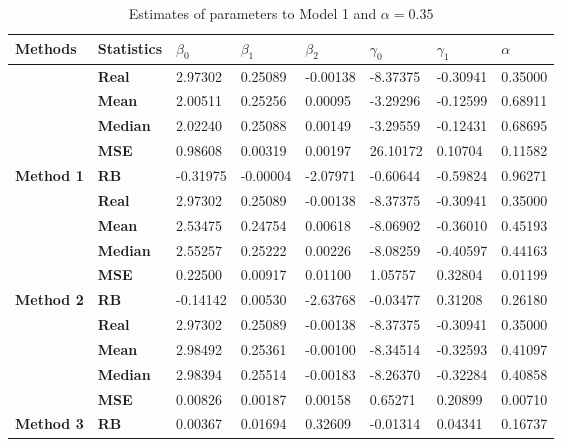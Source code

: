 \begin{table}[h]

\caption{\label{tab:Est_model_1_Alpha0.35}Estimates of parameters to Model 1 and $\alpha=0.35$}
\centering
\begin{tabular}[t]{>{}l>{}lllllll}
\toprule
Methods & Statistics & $\beta_0$ & $\beta_1$ & $\beta_2$ & $\gamma_0$ & $\gamma_1$ & $\alpha$\\
\midrule
 & \textbf{Real} & 2.97302 & 0.25089 & -0.00138 & -8.37375 & -0.30941 & 0.35000\\
\cmidrule{2-8}
 & \textbf{Mean} & 2.00511 & 0.25256 & 0.00095 & -3.29296 & -0.12599 & 0.68911\\
\cmidrule{2-8}
 & \textbf{Median} & 2.02240 & 0.25088 & 0.00149 & -3.29559 & -0.12431 & 0.68695\\
\cmidrule{2-8}
 & \textbf{MSE} & 0.98608 & 0.00319 & 0.00197 & 26.10172 & 0.10704 & 0.11582\\
\cmidrule{2-8}
\multirow{-5}{*}{\raggedright\arraybackslash \textbf{Method 1}} & \textbf{RB} & -0.31975 & -0.00004 & -2.07971 & -0.60644 & -0.59824 & 0.96271\\
\cmidrule{1-8}
 & \textbf{Real} & 2.97302 & 0.25089 & -0.00138 & -8.37375 & -0.30941 & 0.35000\\
\cmidrule{2-8}
 & \textbf{Mean} & 2.53475 & 0.24754 & 0.00618 & -8.06902 & -0.36010 & 0.45193\\
\cmidrule{2-8}
 & \textbf{Median} & 2.55257 & 0.25222 & 0.00226 & -8.08259 & -0.40597 & 0.44163\\
\cmidrule{2-8}
 & \textbf{MSE} & 0.22500 & 0.00917 & 0.01100 & 1.05757 & 0.32804 & 0.01199\\
\cmidrule{2-8}
\multirow{-5}{*}{\raggedright\arraybackslash \textbf{Method 2}} & \textbf{RB} & -0.14142 & 0.00530 & -2.63768 & -0.03477 & 0.31208 & 0.26180\\
\cmidrule{1-8}
 & \textbf{Real} & 2.97302 & 0.25089 & -0.00138 & -8.37375 & -0.30941 & 0.35000\\
\cmidrule{2-8}
 & \textbf{Mean} & 2.98492 & 0.25361 & -0.00100 & -8.34514 & -0.32593 & 0.41097\\
\cmidrule{2-8}
 & \textbf{Median} & 2.98394 & 0.25514 & -0.00183 & -8.26370 & -0.32284 & 0.40858\\
\cmidrule{2-8}
 & \textbf{MSE} & 0.00826 & 0.00187 & 0.00158 & 0.65271 & 0.20899 & 0.00710\\
\cmidrule{2-8}
\multirow{-5}{*}{\raggedright\arraybackslash \textbf{Method 3}} & \textbf{RB} & 0.00367 & 0.01694 & 0.32609 & -0.01314 & 0.04341 & 0.16737\\
\bottomrule
\end{tabular}
\end{table}

